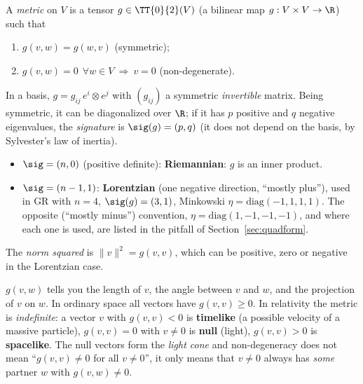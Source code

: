 \begin{formal}[{metric}]
A \emph{metric} on $V$ is a tensor $g\in\TT{0}{2}(V)$ (a bilinear map $g:V\times V\to\R$) such that
\begin{enumerate}[label=(\roman*),nosep]
\item $g(v,w)=g(w,v)$ (symmetric);
\item $g(v,w)=0\ \ \forall w\in V\ \Rightarrow\ v=0$ (non-degenerate).
\end{enumerate}
In a basis, $g=g_{ij}\,e^{i}\otimes e^{j}$ with $(g_{ij})$ a symmetric \emph{invertible} matrix. Being symmetric, it can be diagonalized over $\R$; if it has $p$ positive and $q$ negative eigenvalues, the \emph{signature} is $\sig(g)=(p,q)$ (it does not depend on the basis, by Sylvester's law of inertia). 
\begin{itemize}[nosep]
\item $\sig=(n,0)$ (positive definite): \textbf{Riemannian}: $g$ is an inner product.
\item $\sig=(n-1,1)$: \textbf{Lorentzian} (one negative direction, ``mostly plus''), used in GR with $n=4$, $\sig(g)=(3,1)$, \eg Minkowski $\eta=\mathrm{diag}(-1,1,1,1)$. The opposite (``mostly minus'') convention, $\eta=\mathrm{diag}(1,-1,-1,-1)$, and where each one is used, are listed in the pitfall of Section~\ref{sec:quadform}.
\end{itemize}
The \emph{norm squared} is $\|v\|^2=g(v,v)$, which can be positive, zero or negative in the Lorentzian case.
\end{formal}

\begin{intuition}
$g(v,w)$ tells you the length of $v$, the angle between $v$ and $w$, and the projection of $v$ on $w$. In ordinary space all vectors have $g(v,v)\geq0$. In relativity the metric is \emph{indefinite}: a vector $v$ with $g(v,v)<0$ is \textbf{timelike} (a possible velocity of a massive particle), $g(v,v)=0$ with $v\ne0$ is \textbf{null} (light), $g(v,v)>0$ is \textbf{spacelike}. The null vectors form the \emph{light cone} and non-degeneracy does not mean ``$g(v,v)\neq0$ for all $v\neq0$'', it only means that $v\neq0$ always has \emph{some} partner $w$ with $g(v,w)\neq0$.
\end{intuition}


